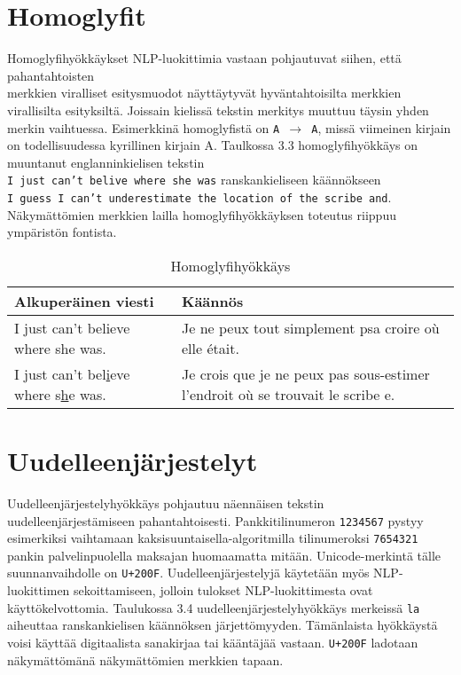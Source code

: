 \section{Homoglyfit}
Homoglyfihyökkäykset NLP-luokittimia vastaan pohjautuvat siihen, että pahantahtoisten\\ merkkien viralliset esitysmuodot näyttäytyvät hyväntahtoisilta merkkien virallisilta esityksiltä. Jois\-sain kielissä tekstin merkitys muuttuu täysin yhden merkin vaihtuessa. Esimerkkinä homoglyfistä on \texttt{A $\rightarrow$ A}, missä viimeinen kirjain on todellisuudessa kyrillinen kirjain A. Taulkossa 3.3 homoglyfihyökkäys on muuntanut englanninkielisen tekstin\\ \texttt{I just can't belive where she was} ranskankieliseen käännökseen\\ \texttt{I guess I can't underestimate the location of the scribe and}.\\
Näkymättömien merkkien lailla homoglyfihyökkäyksen toteutus riippuu ympäristön fontista. \citep{boucher2021bad}

\begin{table}[hbt]
  \begin{tabular}{| l | m{20em} |}
    \hline
    Alkuperäinen viesti & Käännös\\
    \hline
    I just can't believe where she was. & Je ne peux tout simplement psa croire où elle était.\\
    \hline
    I \underline{j}ust can't bel\underline{i}eve where s\underline{h}e was. & Je crois que je ne peux pas sous-estimer l'endroit où se trouvait le scribe e.\\
    \hline
  \end{tabular}
  \caption{Homoglyfihyökkäys \citep{boucher2021bad}}
\end{table}

\section{Uudelleenjärjestelyt}
Uudelleenjärjestelyhyökkäys pohjautuu näennäisen tekstin uudelleenjärjestämiseen pahantahtoisesti. Pankkitilinumeron \texttt{1234567} pystyy esimerkiksi vaihtamaan kaksisuuntaisella-algoritmilla tilinumeroksi \texttt{7654321} pankin palvelinpuolella maksajan huomaamatta mitään. Unicode-merkintä tälle suunnanvaihdolle on \texttt{U+200F}. Uudelleenjärjestelyjä käytetään myös NLP-luokittimen sekoittamiseen, jolloin tulokset NLP-luokittimesta ovat käyttökelvottomia. Taulukossa 3.4 uudelleenjärjestelyhyökkäys merkeissä \texttt{la} aiheuttaa ranskankielisen käännöksen järjettömyyden. Tämänlaista hyökkäystä voisi käyttää digitaalista sanakirjaa tai kääntäjää vastaan. \citep{boucher2021bad} \texttt{U+200F} ladotaan näkymättömänä näkymättömien merkkien tapaan.

